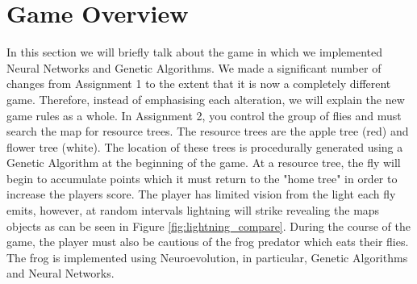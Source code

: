 \section{Game Overview}
In this section we will briefly talk about the game in which we implemented Neural Networks and Genetic Algorithms.
We made a significant number of changes from Assignment 1 to the extent that it is now a completely different game. 
Therefore, instead of emphasising each alteration, we will explain the new game rules as a whole.
In Assignment 2, you control the group
of flies and must search the map for resource trees. The resource trees are the apple tree (red) and flower tree (white).
The location of these trees is procedurally generated using a Genetic Algorithm at the beginning of the game. At a resource tree, the fly will begin to accumulate points which it must return to the "home tree" in order to increase the players score.
The player has limited vision from
the light each fly emits, however, at random intervals lightning will strike revealing the maps objects as can be seen in Figure \ref{fig:lightning_compare}. During the course
of the game, the player must also be cautious of the frog predator which eats their flies. The frog is implemented using Neuroevolution, in particular, Genetic Algorithms and Neural Networks.
